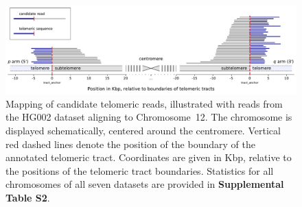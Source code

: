 \documentclass{article}
\begin{document}
        \begin{figure}[h!] \centering %
        \includegraphics[height=.75\textheight,width=\textwidth,keepaspectratio]{../figures/Figure_1.pdf}
        \caption{
             \small Mapping of candidate telomeric reads, illustrated with reads from the HG002 dataset aligning to \mbox{Chromosome 12.}
             The chromosome is displayed schematically, centered around the centromere.
             Vertical red dashed lines denote the position of the boundary of the annotated telomeric tract.
             Coordinates are given in Kbp, relative to the positions of the telomeric tract boundaries.
             Statistics for all chromosomes of all seven datasets are provided in \textbf{Supplemental Table S2}.
        }
        \label{fig:schematic_alignment}
        \end{figure}
\end{document}
